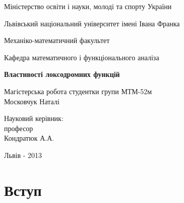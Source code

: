 \documentclass[12pt,a4paper]{article}
\begin{document}

\thispagestyle{empty}
\setlength{\parindent}{1.5cm}
\fontsize{14pt}{6mm}\selectfont

\begin{center}
  Міністерство освіти і науки, молоді та спорту України
  
  Львівський національний університет імені Івана Франка

  Механіко-математичний факультет
\end{center}

\vspace{1cm}

\begin{flushright}
  Кафедра математичного і функціонального аналіза
\end{flushright}

\vspace{4cm}

\begin{center}
  {\bfseries\Large Властивості локсодромних функцій}
\end{center}

\vspace{2cm}

\begin{small}
\begin{flushleft}
  Магістерська робота студентки 
  групи МТМ-52м\\
  Московчук Наталі\linebreak
  
  Науковий керівник:\\
  професор\\
  Кондратюк А.А.
\end{flushleft}
\end{small}

\vspace{4cm}

\begin{center}
  Львів - 2013 
\end{center}

\clearpage



\fontsize{14pt}{6mm}\selectfont

\newcommand{\vect}[1]{(#1_1,#1_2,#1_3,\dots,#1_n)}

\thispagestyle{empty}
\tableofcontents
\clearpage
{}

\section{Вступ}
\end{document}
